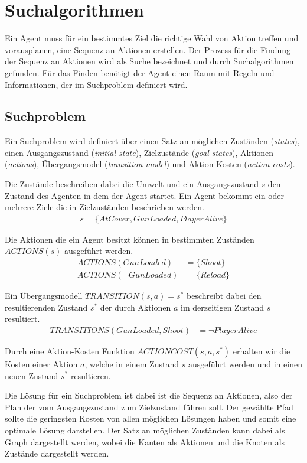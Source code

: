 \chapter{Suchalgorithmen}
Ein Agent muss für ein bestimmtes Ziel die richtige Wahl von Aktion treffen und vorausplanen, eine Sequenz an Aktionen erstellen. Der Prozess für die Findung der Sequenz an Aktionen wird als Suche bezeichnet und durch Suchalgorithmen gefunden. Für das Finden benötigt der Agent einen Raum mit Regeln und Informationen, der im Suchproblem definiert wird.

\section{Suchproblem}
Ein Suchproblem wird definiert über einen Satz an möglichen Zuständen (\textit{states}), einen Ausgangszustand (\textit{initial state}), Zielzustände (\textit{goal states}), Aktionen (\textit{actions}), Übergangsmodel (\textit{transition model}) und Aktion-Kosten (\textit{action costs}).

Die Zustände beschreiben dabei die Umwelt und ein Ausgangszustand $s$ den Zustand des Agenten in dem der Agent startet. Ein Agent bekommt ein oder mehrere Ziele die in Zielzuständen beschrieben werden.
\begin{align*}
s = \{AtCover, GunLoaded, PlayerAlive\}
\end{align*}

Die Aktionen die ein Agent besitzt können in bestimmten Zuständen $ACTIONS(s)$ ausgeführt werden.
\begin{align*}
ACTIONS(GunLoaded) &= \{Shoot\} \\
ACTIONS(\lnot GunLoaded) &= \{Reload\}
\end{align*}

Ein Übergangsmodell $TRANSITION(s,a) = s^*$ beschreibt dabei den resultierenden Zustand $s^*$ der durch Aktionen $a$ im derzeitigen Zustand $s$ resultiert.
\begin{align*}
TRANSITIONS(GunLoaded, Shoot) &= \lnot PlayerAlive
\end{align*}

Durch eine Aktion-Kosten Funktion $ACTIONCOST(s,a,s^*)$ erhalten wir die Kosten einer Aktion $a$, welche in einem Zustand $s$ ausgeführt werden und in einen neuen Zustand $s^*$ resultieren.

Die Lösung für ein Suchproblem ist dabei ist die Sequenz an Aktionen, also der Plan der vom Ausgangszustand zum Zielzustand führen soll. Der gewählte Pfad sollte die geringsten Kosten von allen möglichen Lösungen haben und somit eine optimale Lösung darstellen. Der Satz an möglichen Zuständen kann dabei als Graph dargestellt werden, wobei die Kanten als Aktionen und die Knoten als Zustände dargestellt werden.

